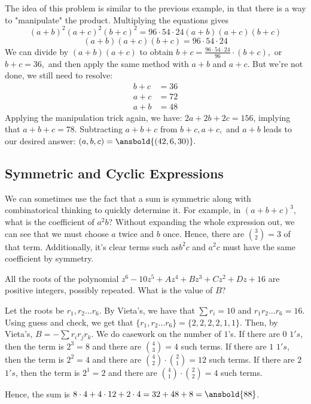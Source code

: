 \documentclass[mast]{lucky}
\begin{document}
\begin{sol}
The idea of this problem is similar to the previous example, in that there is a way to "manipulate" the product. Multiplying the equations gives
\[(a+b)^2(a+c)^2(b+c)^2 = 96 \cdot 54 \cdot 24(a+b)(a+c)(b+c)\]
\[(a+b)(a+c)(b+c)= 96 \cdot 54 \cdot 24\]
We can divide by $(a+b)(a+c)$ to obtain $b+c = \frac{96 \cdot 54 \cdot 24}{96} \cdot (b+c),$ or $b+c = 36,$ and then apply the same method with $a+b$ and $a+c.$ But we're not done, we still need to resolve:
\begin{align*}
b+c &= 36 \\
a+c &= 72\\
a+b &= 48
\end{align*}
Applying the manipulation trick again, we have: $2a +2b+2c = 156$, implying that $a+b+c = 78.$ Subtracting $a+b+c$ from $b+c,a+c,$ and $a+b$ leads to our desired answer: $(a,b,c)=\ansbold{(42,6,30)}.$
\end{sol}
\subsection{Symmetric and Cyclic Expressions}
We can sometimes use the fact that a sum is symmetric along with combinatorical thinking to quickly determine it. For example, in $(a+b+c)^3$, what is the coefficient of $a^2b$? Without expanding the whole expression out, we can see that we must choose $a$ twice and $b$ once. Hence, there are $\binom{3}{2}=3$ of that term. Additionally, it's clear terms such  as$b^2c$ and $a^2c$ must have the same coefficient by symmetry.

\begin{exam}[AMC 10A 2021/14]
All the roots of the polynomial $z^6-10z^5+Az^4+Bz^3+Cz^2+Dz+16$ are positive integers, possibly repeated. What is the value of $B$?
\end{exam}

\begin{sol}
Let the roots be $r_{1},r_{2}\ldots r_{6}$. By Vieta's, we have that $\sum r_{i}=10$ and $r_{1}r_{2}\ldots r_{6}=16$. Using guess and check, we get that $\{r_{1},r_{2}\ldots r_{6}\} = \{2,2,2,2,1,1\}$. Then, by Vieta's, $B=-\sum r_{i}r_{j}r_{k}$. We do casework on the number of $1$'s. If there are $0$ $1's$, then the term is $2^3=8$ and there are $\binom{4}{3}=4$ such terms. If there are $1$ $1's$, then the term is $2^2=4$ and there are $\binom{4}{2}\cdot \binom{2}{1}=12$ such terms. If there are $2$ $1's$, then the term is $2^1=2$ and there are $\binom{4}{1}\cdot \binom{2}{2}=4$ such terms.

Hence, the sum is $8\cdot 4+4\cdot 12+2\cdot 4=32+48+8=\ansbold{88}$.
\end{sol}
\end{document}
